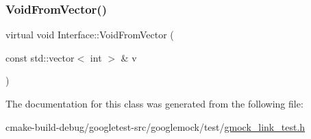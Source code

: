 \subsubsection{\texorpdfstring{VoidFromVector()}{VoidFromVector()}}
{\footnotesize\ttfamily virtual void Interface\+::\+Void\+From\+Vector (\begin{DoxyParamCaption}\item[{const std\+::vector$<$ int $>$ \&}]{v }\end{DoxyParamCaption})\hspace{0.3cm}{\ttfamily [pure virtual]}}



The documentation for this class was generated from the following file\+:\begin{DoxyCompactItemize}
\item 
cmake-\/build-\/debug/googletest-\/src/googlemock/test/\mbox{\hyperlink{gmock__link__test_8h}{gmock\+\_\+link\+\_\+test.\+h}}\end{DoxyCompactItemize}
